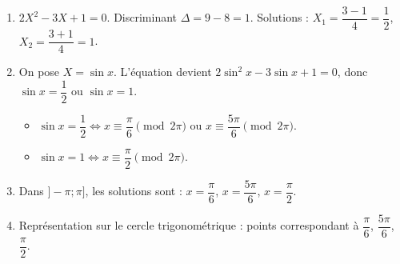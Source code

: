 \begin{enumerate}[label=\arabic*)]
\item $2X^2 - 3X + 1 = 0$. Discriminant $\Delta = 9 - 8 = 1$. Solutions : $X_1 = \dfrac{3-1}{4} = \dfrac{1}{2}$, $X_2 = \dfrac{3+1}{4} = 1$.
\item On pose $X = \sin x$. L'équation devient $2\sin^2 x - 3\sin x + 1 = 0$, donc $\sin x = \dfrac{1}{2}$ ou $\sin x = 1$.
\begin{itemize}
\item $\sin x = \dfrac{1}{2} \iff x \equiv \dfrac{\pi}{6} \pmod{2\pi}$ ou $x \equiv \dfrac{5\pi}{6} \pmod{2\pi}$.
\item $\sin x = 1 \iff x \equiv \dfrac{\pi}{2} \pmod{2\pi}$.
\end{itemize}
\item Dans $]-\pi;\pi]$, les solutions sont : $x = \dfrac{\pi}{6}$, $x = \dfrac{5\pi}{6}$, $x = \dfrac{\pi}{2}$.
\item Représentation sur le cercle trigonométrique : points correspondant à $\dfrac{\pi}{6}$, $\dfrac{5\pi}{6}$, $\dfrac{\pi}{2}$.
\end{enumerate}